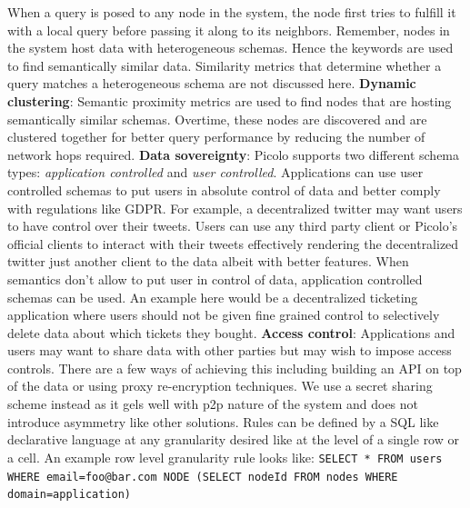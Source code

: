 \documentclass[preprint,10pt]{elsarticle}
\begin{document}
When a query is posed to any node in the system, the node first tries to fulfill it with a local query before passing it along to its neighbors. Remember, nodes in the system host data with heterogeneous schemas. Hence the keywords are used to find semantically similar data. Similarity metrics that determine whether a query matches a heterogeneous schema are not discussed here.
\newline
\newline
\textbf{Dynamic clustering}:
Semantic proximity metrics are used to find nodes that are hosting semantically similar schemas. Overtime, these nodes are discovered and are clustered together for better query performance by reducing the number of network hops required.
\newline
\newline
\textbf{Data sovereignty}: 
Picolo supports two different schema types: \textit{application controlled} and \textit{user controlled}. Applications can use user controlled schemas to put users in absolute control of data and better comply with regulations like GDPR. For example, a decentralized twitter may  want users to have control over their tweets. Users can use any third party client or Picolo's official clients to interact with their tweets effectively rendering the decentralized twitter just another client to the data albeit with better features. \newline\newline
When semantics don't allow to put user in control of data, application controlled schemas can be used. An example here would be a decentralized ticketing application where users should not be given fine grained control to selectively delete data about which tickets they bought.
\newline
\newline
\textbf{Access control}:
Applications and users may want to share data with other parties but may wish to impose access controls. There are a few ways of achieving this including building an API on top of the data or using proxy re-encryption techniques. We use a secret sharing scheme instead as it gels well with p2p nature of the system and does not introduce asymmetry like other solutions. Rules can be defined by a SQL like declarative language at any granularity desired like at the level of a single row or a cell. An example row level granularity rule looks like:\newline \newline
\texttt{SELECT  * \newline FROM users \newline WHERE email=foo@bar.com \newline NODE (SELECT nodeId FROM nodes WHERE domain=application)} \newline \newline
\end{document}
